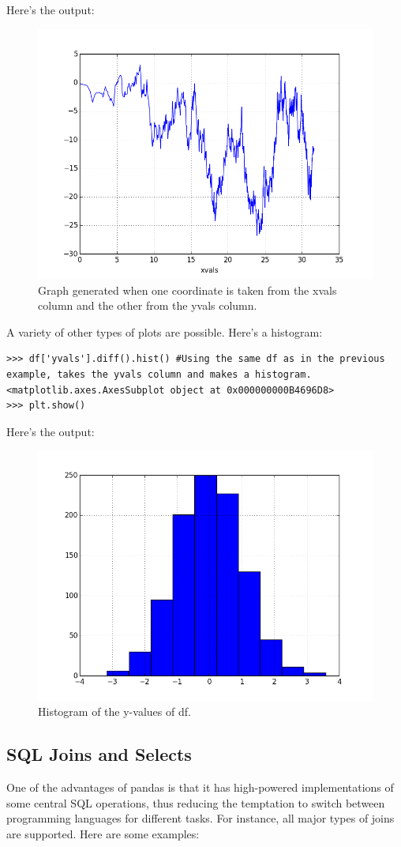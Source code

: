 Here's the output:

\begin{figure}
\centering
\includegraphics[width=.5 \textwidth]{cumsumplot1.png}
\caption{ Graph generated when one coordinate is taken from the xvals column and the other from the yvals column.
}
\label{pandas:cumsumplot1}
\end{figure}

A variety of other types of plots are possible. Here's a histogram:

\begin{lstlisting}
>>> df['yvals'].diff().hist() #Using the same df as in the previous example, takes the yvals column and makes a histogram.
<matplotlib.axes.AxesSubplot object at 0x000000000B4696D8>
>>> plt.show()
\end{lstlisting}

Here's the output:

\begin{figure}
\centering
\includegraphics[width=.5 \textwidth]{cumsumplot2.png}
\caption{ Histogram of the y-values of df.
}
\label{pandas:cumsumplot2}
\end{figure}




\subsection*{SQL Joins and Selects}

One of the advantages of pandas is that it has high-powered implementations of some central SQL operations, thus reducing the temptation to switch between programming languages for different tasks. For instance, all major types of joins are supported. Here are some examples:


